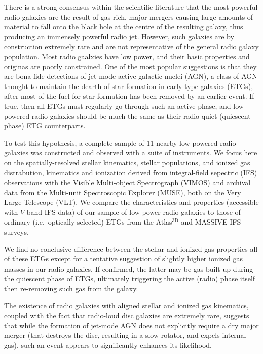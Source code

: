 \begin{abstractlong}
There is a strong consensus within the scientific literature that the most powerful radio galaxies are the result of gas-rich, major mergers causing large amounts of material to fall onto the black hole at the centre of the resulting galaxy, thus producing an immensely powerful radio jet. However, such galaxies are by construction extremely rare and are not representative of the general radio galaxy population. Most radio gaalxies have low power, and their basic properties and originas are poorly constrained. One of the most popular suggestions is that they are bona-fide detections of jet-mode active galactic nuclei (AGN), a class of AGN thought to maintain the dearth of star formation in early-type galaxies (ETGs), after most of the fuel for star formation has been removed by an earlier event. If true, then all ETGs must regularly go through such an active phase, and low-powered radio galaxies should be much the same as their radio-quiet (quiescent phase) ETG counterparts. 

To test this hypothesis, a complete sample of 11 nearby low-powered radio galaxies was constructed and observed with a suite of instruments. We focus here on the spatially-resolved stellar kinematics, stellar populations, and ionized gas distrabution, kinematics and ionization derived from integral-field sepectric (IFS) observations with the Visible Multi-object Spectrograph (VIMOS) and archival data from the Multi-unit Spectroscopic Explorer (MUSE), both on the Very Large Telescope (VLT). We compare the characteristics and properties (accessible with $V$-band IFS data) of our sample of low-power radio galaxies to those of ordinary (i.e.\ optically-selected) ETGs from the Atlas$^\text{3D}$ and MASSIVE IFS surveys.

We find no conclusive difference between the stellar and ionized gas properties all of these ETGs except for a tentative suggestion of slightly higher ionized gas masses in our radio galaxies. If confirmed, the latter may be gas built up during the quiescent phase of ETGs, ultimately triggering the active (radio) phase itself then re-removing such gas from the galaxy.

The existence of radio galaxies with aligned stellar and ionized gas kinematics, coupled with the fact that radio-loud disc galaxies are extremely rare, suggests that while the formation of jet-mode AGN does not explicitly require a dry major merger (that destroys the disc, resulting in a slow rotator, and expels internal gas), such an event appears to significantly enhances its likelihood. 
\end{abstractlong}


